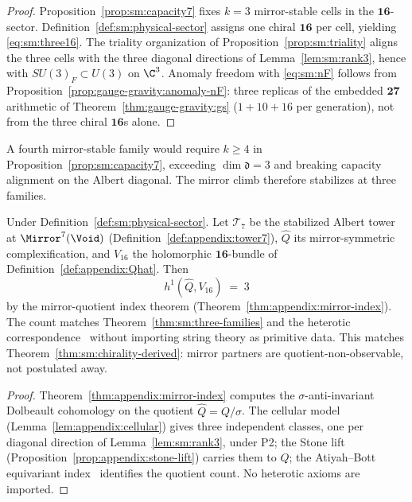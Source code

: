 \begin{proof}
Proposition~\ref{prop:sm:capacity7} fixes $k=3$ mirror-stable cells in the
$\mathbf{16}$-sector. Definition~\ref{def:sm:physical-sector} assigns one chiral
$\mathbf{16}$ per cell, yielding \eqref{eq:sm:three16}. The triality
organization of Proposition~\ref{prop:sm:triality} aligns the three cells with
the three diagonal directions of Lemma~\ref{lem:sm:rank3}, hence with
$SU(3)_F\subset U(3)$ on $\C^3$. Anomaly freedom with \eqref{eq:sm:nF} follows from
Proposition~\ref{prop:gauge-gravity:anomaly-nF}: three replicas of the
embedded $\mathbf{27}$ arithmetic of Theorem~\ref{thm:gauge-gravity:gs}
($1+10+16$ per generation), not from the three chiral $\mathbf{16}$s alone.
\end{proof}

\begin{corollary}\label{cor:sm:no4th}
A fourth mirror-stable family would require $k\geq4$ in
Proposition~\ref{prop:sm:capacity7}, exceeding $\dim\mathfrak{d}=3$ and
breaking capacity alignment on the Albert diagonal. The mirror climb
therefore stabilizes at three families.
\end{corollary}

\begin{theorem}\label{thm:sm:h1}
Under Definition~\ref{def:sm:physical-sector}. Let $\mathcal{T}_7$ be the stabilized Albert tower at
$\Mirror^7(\Void)$ (Definition~\ref{def:appendix:tower7}), $\hat Q$ its
mirror-symmetric complexification, and $V_{16}$ the holomorphic
$\mathbf{16}$-bundle of Definition~\ref{def:appendix:Qhat}. Then
\begin{equation}\label{eq:sm:h1}
  h^1(\hat Q,V_{16}) \;=\; 3
\end{equation}
by the mirror-quotient index theorem (Theorem~\ref{thm:appendix:mirror-index}).
The count matches Theorem~\ref{thm:sm:three-families} and the heterotic
correspondence~\cite{Witten1985} without importing string theory as primitive
data. This matches Theorem~\ref{thm:sm:chirality-derived}: mirror partners are
quotient-non-observable, not postulated away.
\end{theorem}

\begin{proof}
Theorem~\ref{thm:appendix:mirror-index} computes the $\sigma$-anti-invariant
Dolbeault cohomology on the quotient $\hat Q=Q/\sigma$. The cellular model
(Lemma~\ref{lem:appendix:cellular}) gives three independent classes, one per
diagonal direction of Lemma~\ref{lem:sm:rank3}, under P2; the Stone lift
(Proposition~\ref{prop:appendix:stone-lift}) carries them to $Q$; the
Atiyah--Bott equivariant index~\cite{AtiyahBott1966} identifies the quotient
count. No heterotic axioms are imported.
\end{proof}

